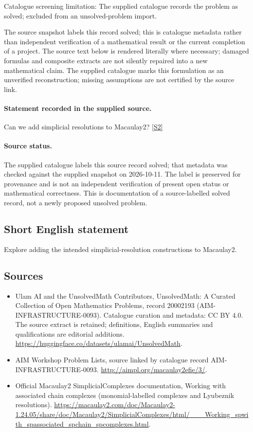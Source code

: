 \documentclass[11pt]{article}
\begin{document}
Catalogue screening limitation: The supplied catalogue records the problem as solved; excluded from an unsolved-problem import.

The source snapshot labels this record solved; this is catalogue metadata rather than independent verification of a mathematical result or the current completion of a project.
The source text below is rendered literally where necessary; damaged formulas and composite extracts are not silently repaired into a new mathematical claim.
The supplied catalogue marks this formulation as an unverified reconstruction; missing assumptions are not certified by the source link.
\paragraph{Statement recorded in the supplied source.}
Can we add simplicial resolutions to Macaulay2? \href{http://aimpl.org/macaulay2efie/3/}{[S2]}
\paragraph{Source status.}
The supplied catalogue labels this source record solved; that metadata was checked against the supplied snapshot on 2026-10-11. The label is preserved for provenance and is not an independent verification of present open status or mathematical correctness. This is documentation of a source-labelled solved record, not a newly proposed unsolved problem.
\subsection{Short English statement}
Explore adding the intended simplicial-resolution constructions to Macaulay2.
\subsection{Sources}
\begin{itemize}
\item[S1] Ulam AI and the UnsolvedMath Contributors, UnsolvedMath: A Curated Collection of Open Mathematics Problems, record 20002193 (AIM-INFRASTRUCTURE-0093). Catalogue curation and metadata: CC BY 4.0. The source extract is retained; definitions, English summaries and qualifications are editorial additions.
\url{https://huggingface.co/datasets/ulamai/UnsolvedMath}.
\item[S2] AIM Workshop Problem Lists, source linked by catalogue record AIM-INFRASTRUCTURE-0093.
\url{http://aimpl.org/macaulay2efie/3/}.
\item[S3] Official Macaulay2 SimplicialComplexes documentation, Working with associated chain complexes (monomial-labelled complexes and Lyubeznik resolutions).
\url{https://macaulay2.com/doc/Macaulay2-1.24.05/share/doc/Macaulay2/SimplicialComplexes/html/___Working_spwith_spassociated_spchain_spcomplexes.html}.
\end{itemize}
\end{document}
